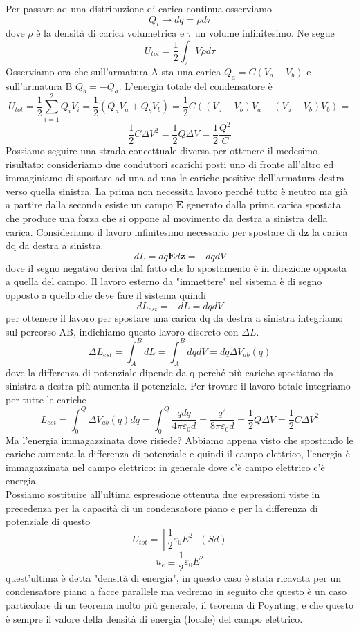 \documentclass[10pt,a4paper]{article}
\begin{document}
Per passare ad una distribuzione di carica continua osserviamo
\[Q_i \to dq = \rho d\tau\]
dove $\rho$ è la densità di carica volumetrica e $\tau$ un volume infinitesimo. Ne segue
\[U_{tot} = \frac{1}{2}\int_{\tau} V\rho d\tau\]
Osserviamo ora che sull'armatura A sta una carica \(Q_a = C(V_a - V_b)\) e sull'armatura B \(Q_b = - Q_a\). L'energia totale del condensatore è
\[U_{tot} = \frac{1}{2}\sum_{i=1}^{2} Q_i V_i = \frac{1}{2} (Q_a V_a + Q_b V_b)= \frac{1}{2}C((V_a - V_b) V_a - (V_a - V_b) V_b) = \]
\[\frac{1}{2}C\Delta V^2 = \frac{1}{2}Q\Delta V = \frac{1}{2}\frac{Q^2}{C}\]
Possiamo seguire una strada concettuale diversa per ottenere il medesimo risultato: consideriamo due conduttori scarichi posti uno di fronte all'altro ed immaginiamo di spostare ad una ad una le cariche positive dell'armatura destra verso quella sinistra. La prima non necessita lavoro perché tutto è neutro ma già a partire dalla seconda esiste un campo $\mathbf{E}$ generato dalla prima carica spostata che produce una forza che si oppone al movimento da destra a sinistra della carica. Consideriamo il lavoro infinitesimo necessario per spostare di d$\mathbf{z}$ la carica dq da destra a sinistra. 
\[dL = dq\mathbf{E}d\mathbf{z} = -dqdV \]
dove il segno negativo deriva dal fatto che lo spostamento è in direzione opposta a quella del campo. Il lavoro esterno da "immettere" nel sistema è di segno opposto a quello che deve fare il sistema quindi
\[dL_{est} = -dL = dqdV\]
per ottenere il lavoro per spostare una carica dq da destra a sinistra integriamo sul percorso AB, indichiamo questo lavoro discreto con \(\Delta L\).
\[\Delta L_{est} = \int_{A}^{B} dL = \int_{A}^{B} dqdV = dq \Delta V_{ab}(q) \]
dove la differenza di potenziale dipende da q perché più cariche spostiamo da sinistra a destra più aumenta il potenziale. Per trovare il lavoro totale integriamo per tutte le cariche
\[L_{est} = \int_0^Q  \Delta V_{ab}(q) dq= \int_0^Q \frac{qdq}{4\pi\varepsilon_0 d} = \frac{q^2}{8\pi\varepsilon_0 d} = \frac{1}{2}Q\Delta V = \frac{1}{2} C \Delta V^2\]
Ma l'energia immagazzinata dove risiede? Abbiamo appena visto che spostando le cariche aumenta la differenza di potenziale e quindi il campo elettrico, l'energia è immagazzinata nel campo elettrico: in generale dove c'è campo elettrico c'è energia.\\
Possiamo sostituire all'ultima espressione ottenuta due espressioni viste in precedenza per la capacità di un condensatore piano e per la differenza di potenziale di questo 
\[U_{tot} = [\frac{1}{2}\varepsilon_0 E^2](Sd) \]
\[u_e \equiv \frac{1}{2}\varepsilon_0 E^2\]
quest'ultima è detta "densità di energia", in questo caso è stata ricavata per un condensatore piano a facce parallele ma vedremo in seguito che questo è un caso particolare di un teorema molto più generale, il teorema di Poynting, e che questo è sempre il valore della densità di energia (locale) del campo elettrico.
\end{document}
